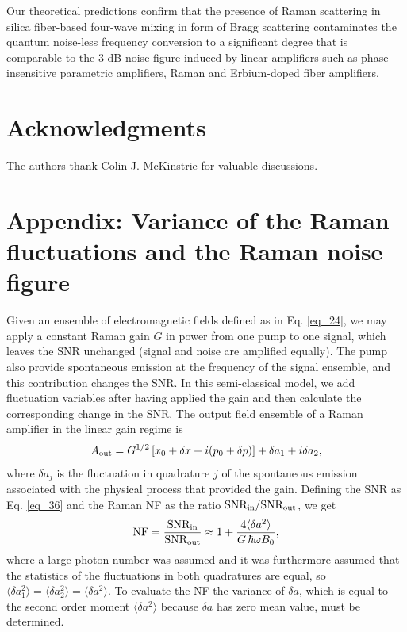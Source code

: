 \documentclass[10pt,letterpaper]{article}
\begin{document}
Our theoretical predictions confirm that the presence of Raman scattering in silica fiber-based four-wave mixing in form of Bragg scattering contaminates the quantum noise-less frequency conversion to a significant degree that is comparable to the 3-dB noise figure induced by linear amplifiers such as phase-insensitive parametric amplifiers, Raman and Erbium-doped fiber amplifiers.


\section*{Acknowledgments}
The authors thank Colin J. McKinstrie for valuable discussions.

%
%
%
%
\appendix


\section*{Appendix: Variance of the Raman fluctuations and the Raman noise figure}
Given an ensemble of electromagnetic fields defined as in Eq. \eqref{eq_24}, we may apply a constant Raman gain $G$ in power from one pump to one signal, which leaves the SNR unchanged (signal and noise are amplified equally). The pump also provide spontaneous emission at the frequency of the signal ensemble, and this contribution changes the SNR. In this semi-classical model, we add fluctuation variables after having applied the gain and then calculate the corresponding change in the SNR. The output field ensemble of a Raman amplifier in the linear gain regime is
\begin{eqnarray} \label{eq_34}
A_{\rm out} = G^{1/2}\left[x_0 + \delta x+i(p_0+\delta p)\right] + \delta a_1 +i\delta a_2,
\end{eqnarray}
where $\delta a_j$ is the fluctuation in quadrature $j$ of the spontaneous emission associated with the physical process that provided the gain. Defining the SNR as Eq. \eqref{eq_36} and the Raman NF as the ratio $\rm SNR_{in}/SNR_{out}$, we get
\begin{eqnarray} \label{eq_25}
{\rm NF} = {\rm \frac{SNR_{in}}{SNR_{out}}} \approx 1+\frac{4\langle \delta a^2 \rangle}{G\, \hbar \omega B_0},
\end{eqnarray}
where a large photon number was assumed and it was furthermore assumed that the statistics of the fluctuations in both quadratures are equal, so $\langle \delta a_1^2 \rangle = \langle \delta a_2^2 \rangle = \langle \delta a^2 \rangle$. To evaluate the NF the variance of $\delta a$, which is equal to the second order moment  $\langle \delta a^2 \rangle$ because $\delta a$ has zero mean value, must be determined. 
\end{document}

